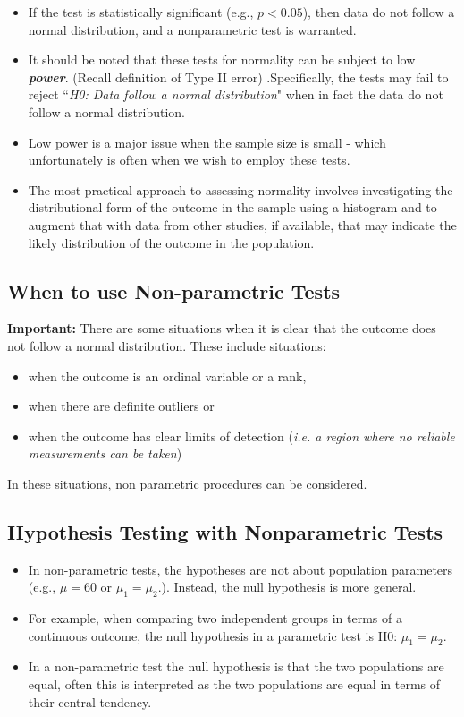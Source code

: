 \documentclass[12pt, a4paper]{report}
\theoremstyle{plain}
\theoremstyle{definition}
\theoremstyle{remark}
\begin{document}
\begin{itemize}
\item If the test is statistically significant (e.g., $p<0.05$), then data do not follow a normal distribution, and a nonparametric test is warranted. 

\item It should be noted that these tests for normality can be subject to low \textbf{\textit{power}}. (Recall definition of Type II error) .Specifically, the tests may fail to reject ``\textit{H0: Data follow a normal distribution}" when in fact the data do not follow a normal distribution. 
\item Low power is a major issue when the sample size is small - which unfortunately is often when we wish to employ these tests. 
\item The most practical approach to assessing normality involves investigating the distributional form of the outcome in the sample using a histogram and to augment that with data from other studies, if available, that may indicate the likely distribution of the outcome in the population.
\end{itemize}


\subsection*{When to use Non-parametric Tests}

\textbf{Important:} There are some situations when it is clear that the outcome does not follow a normal distribution. These include situations:

\begin{itemize}
\item when the outcome is an ordinal variable or a rank,
\item when there are definite outliers or
\item when the outcome has clear limits of detection (\textit{i.e. a region where no reliable measurements can be taken})
\end{itemize}
In these situations, non parametric procedures can be considered.



\subsection*{Hypothesis Testing with Nonparametric Tests}
\begin{itemize}
\item In non-parametric tests, the hypotheses are not about population parameters (e.g., $\mu=60$ or $\mu_1 = \mu_2$.).   Instead, the null hypothesis is more general.   
\item For example, when comparing two independent groups in terms of a continuous outcome, the null hypothesis in a parametric test is H0: $\mu_1 = \mu_2$. 
\item In a non-parametric test the null hypothesis is that the two populations are equal, often this is interpreted as the two populations are equal in terms of their central tendency.
\end{itemize}
\end{document}
